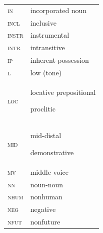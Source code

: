 \documentclass[output=paper]{langsci/langscibook}
\begin{document}
\begin{tabularx}{.45\textwidth}{lX}
\textsc{in}   &  incorporated noun \\

\textsc{incl }  &  inclusive \\

\textsc{instr }  &  instrumental \\

\textsc{intr}  &   intransitive \\

\textsc{ip}  &  inherent possession \\

\textsc{l}  &  low (tone) \\

\textsc{loc}   &  locative prepositional

proclitic \\

\textsc{mid}  &  mid-distal

demonstrative \\

\textsc{mv}  &   middle voice \\

\textsc{nn}  &  noun-noun \\

\textsc{nhum}  &  nonhuman \\

\textsc{neg}  &   negative \\

\textsc{nfut}  &  nonfuture \\
\end{tabularx}
\end{document}
